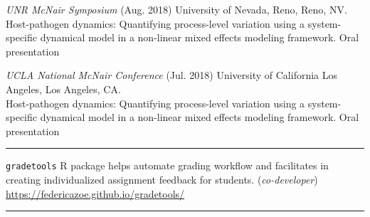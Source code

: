 \documentclass{article}
\begin{document}
\begin{description}
		\textit{UNR McNair Symposium} (Aug. 2018) University of Nevada, Reno, Reno, NV.\\
		Host-pathogen dynamics: Quantifying process-level variation using a system-specific dynamical model in a non-linear mixed effects modeling framework. Oral presentation
		\vspace*{1mm}
		
		\textit{UCLA National McNair Conference} (Jul. 2018) University of California Los Angeles, Los Angeles, CA.\\
		Host-pathogen dynamics: Quantifying process-level variation using a system-specific dynamical model in a non-linear mixed effects modeling framework. Oral presentation
		\vspace*{1mm}
		
	
\end{description}
\vspace{-2mm}
\rule{\linewidth}{1pt}




\begin{description}
	\vspace{-2mm}
	\item[Software Developed]\hspace*{.1in} 
	
	\texttt{gradetools} R package helps automate grading workflow and facilitates in creating individualized assignment feedback for students. (\textit{co-developer}) \url{https://federicazoe.github.io/gradetools/}
	
\end{description}
\vspace{-2mm}
\rule{\linewidth}{1pt}

	
\end{document}
